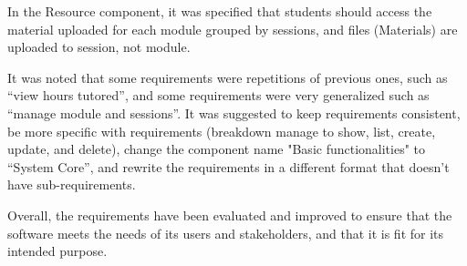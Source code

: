 \begin{justify}
    \vspace{0.25cm}
    \newendline In the Resource component, it was specified that students should access the material uploaded for each module grouped by sessions, and files (Materials) are uploaded to session, not module.

    \vspace{0.25cm}
    \newendline It was noted that some requirements were repetitions of previous ones, such as “view hours tutored”, and some requirements were very generalized such as “manage module and sessions”. It was suggested to keep requirements consistent, be more specific with requirements (breakdown manage to show, list, create, update, and delete), change the component name "Basic functionalities" to “System Core”, and rewrite the requirements in a different format that doesn't have sub-requirements.

    \vspace{0.25cm}
    \newendline Overall, the requirements have been evaluated and improved to ensure that the software meets the needs of its users and stakeholders, and that it is fit for its intended purpose.
\end{justify}

\clearpage
\vspace{0.25cm}

